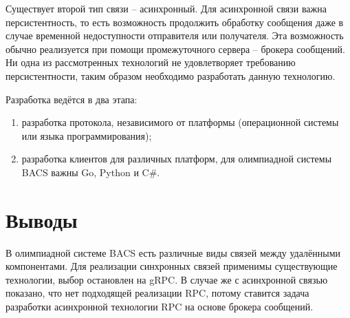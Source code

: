Существует второй тип связи -- асинхронный. Для асинхронной связи
важна персистентность, то есть возможность продолжить обработку сообщения
даже в случае временной недоступности отправителя или получателя.
Эта возможность обычно реализуется при помощи промежуточного сервера --
брокера сообщений. Ни одна из рассмотренных технологий не удовлетворяет
требованию персистентности, таким образом необходимо разработать данную
технологию.

Разработка ведётся в два этапа:
\begin{enumerate}
    \item разработка протокола, независимого от платформы (операционной системы
        или языка программирования);
    \item разработка клиентов для различных платформ, для олимпиадной системы
        BACS важны Go, Python и C\#.
\end{enumerate}

\section{Выводы}
В олимпиадной системе BACS есть различные виды связей между
удалёнными компонентами. Для реализации синхронных связей применимы
существующие технологии, выбор остановлен на gRPC. В случае же с асинхронной
связью показано, что нет подходящей реализации RPC, потому ставится задача
разработки асинхронной технологии RPC на основе брокера сообщений.
